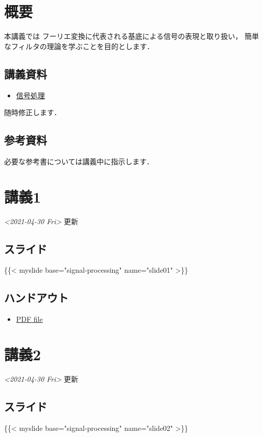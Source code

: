 \documentclass[11pt]{article}
\author{Noboru Murata}
\date{\today}
\title{}
\begin{document}
\tableofcontents


\section{概要}
\label{sec:orga0525e3}
本講義では
フーリエ変換に代表される基底による信号の表現と取り扱い，
簡単なフィルタの理論を学ぶことを目的とします．

\subsection{講義資料}
\label{sec:org12584aa}
\begin{itemize}
\item \href{https://noboru-murata.github.io/signal-processing/pdfs/signal-processing.pdf}{信号処理}
\end{itemize}
随時修正します．

\subsection{参考資料}
\label{sec:org1e3cd38}
必要な参考書については講義中に指示します．

\section{講義1}
\label{sec:orge635631}
\textit{<2021-04-30 Fri> } 更新
\subsection{スライド}
\label{sec:org0621a66}
\{\{< myslide base="signal-processing" name="slide01" >\}\}
\subsection{ハンドアウト}
\label{sec:orge60b084}
\begin{itemize}
\item \href{https://noboru-murata.github.io/signal-processing/pdfs/slide01.pdf}{PDF file}
\end{itemize}

\section{講義2}
\label{sec:orgce3bbc6}
\textit{<2021-04-30 Fri> } 更新
\subsection{スライド}
\label{sec:orgfd98243}
\{\{< myslide base="signal-processing" name="slide02" >\}\}
\end{document}
